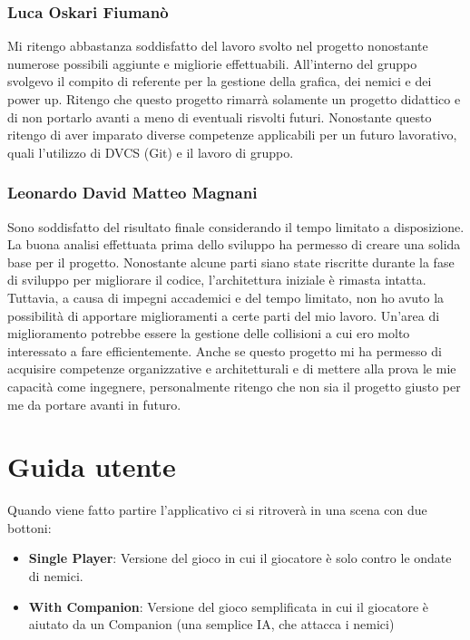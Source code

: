 \documentclass[a4paper,12pt]{report}
\begin{document}
\subsection*{Luca Oskari Fiumanò}
Mi ritengo abbastanza soddisfatto del lavoro svolto nel progetto nonostante numerose possibili aggiunte e migliorie effettuabili. 
All’interno del gruppo svolgevo il compito di referente per la gestione della grafica, dei nemici e dei power up. 
Ritengo che questo progetto rimarrà solamente un progetto didattico e di non portarlo avanti a meno di eventuali risvolti futuri. 
Nonostante questo ritengo di aver imparato diverse competenze applicabili per un futuro lavorativo, quali l’utilizzo di DVCS (Git) e il lavoro di gruppo.
\subsection*{Leonardo David Matteo Magnani}
Sono soddisfatto del risultato finale considerando il tempo limitato a disposizione. 
La buona analisi effettuata prima dello sviluppo ha permesso di creare una solida base per il progetto. 
Nonostante alcune parti siano state riscritte durante la fase di sviluppo per migliorare il codice, l'architettura iniziale è rimasta intatta. 
Tuttavia, a causa di impegni accademici e del tempo limitato, non ho avuto la possibilità di apportare miglioramenti a certe parti del mio lavoro. 
Un'area di miglioramento potrebbe essere la gestione delle collisioni a cui ero molto interessato a fare efficientemente.
Anche se questo progetto mi ha permesso di acquisire competenze organizzative e architetturali e di mettere alla prova le mie capacità come ingegnere, 
personalmente ritengo che non sia il progetto giusto per me da portare avanti in futuro.

\appendix
\chapter{Guida utente}

Quando viene fatto partire l'applicativo ci si ritroverà in una scena con due bottoni:
\begin{itemize}
    \item \textbf{Single Player}: Versione del gioco in cui il giocatore è solo contro le ondate di nemici.
    \item \textbf{With Companion}: Versione del gioco semplificata in cui il giocatore è aiutato da un Companion (una semplice IA, che attacca i nemici) 
\end{itemize}
\end{document}

